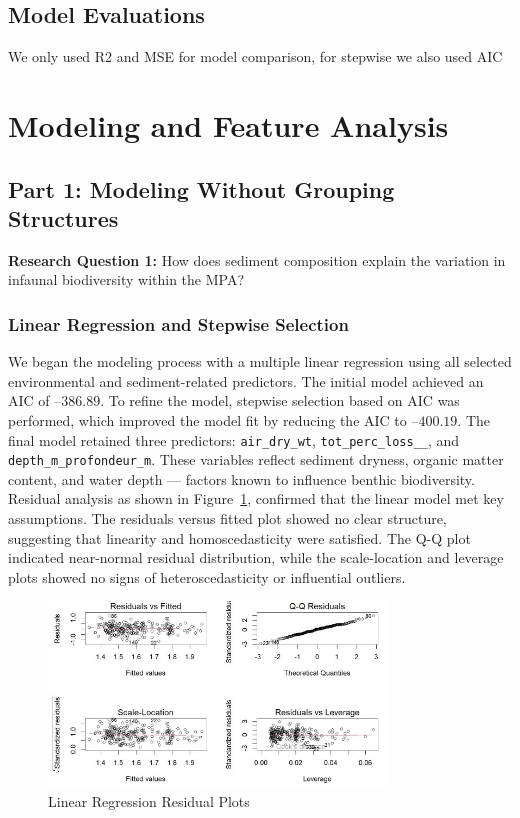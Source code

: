 \documentclass[12pt]{article}
\begin{document}
\subsection{Model Evaluations}

\qquad We only used R2 and MSE for model comparison, for stepwise we also used AIC


\newpage

\section{Modeling and Feature Analysis}

\subsection{Part 1: Modeling Without Grouping Structures}

\textbf{Research Question 1:} How does sediment composition explain the variation in infaunal biodiversity within the MPA?

\subsubsection{Linear Regression and Stepwise Selection}

\qquad We began the modeling process with a multiple linear regression using all
selected environmental and sediment-related predictors. The initial model
achieved an AIC of $–386.89$. To refine the model, stepwise selection based on
AIC was performed, which improved the model fit by reducing the AIC to
$–400.19$. The final model retained three predictors: \texttt{air\_dry\_wt},
\texttt{tot\_perc\_loss\_\_}, and \texttt{depth\_m\_profondeur\_m}. These
variables reflect sediment dryness, organic matter content, and water depth —
factors known to influence benthic biodiversity. Residual analysis as shown in
Figure~\ref{fig:residual-plots}, confirmed that the linear model met key
assumptions. The residuals versus fitted plot showed no clear structure,
suggesting that linearity and homoscedasticity were satisfied. The Q-Q plot
indicated near-normal residual distribution, while the scale-location and
leverage plots showed no signs of heteroscedasticity or influential outliers.

\begin{figure}[H]
\centering
\includegraphics[width=0.8\textwidth]{linear-regression-residual-plots.jpg}
\caption{Linear Regression Residual Plots}
\label{fig:residual-plots}
\end{figure}
\end{document}
